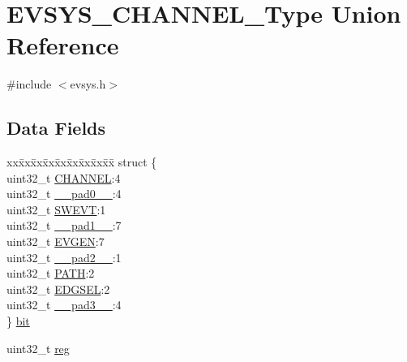 \hypertarget{union_e_v_s_y_s___c_h_a_n_n_e_l___type}{}\section{E\+V\+S\+Y\+S\+\_\+\+C\+H\+A\+N\+N\+E\+L\+\_\+\+Type Union Reference}
\label{union_e_v_s_y_s___c_h_a_n_n_e_l___type}


{\ttfamily \#include $<$evsys.\+h$>$}

\subsection*{Data Fields}
\begin{DoxyCompactItemize}
\item 
\begin{tabbing}
xx\=xx\=xx\=xx\=xx\=xx\=xx\=xx\=xx\=\kill
struct \{\\
\>uint32\_t \mbox{\hyperlink{union_e_v_s_y_s___c_h_a_n_n_e_l___type_a35f435efb5008b5086efe95dc8efd5d7}{CHANNEL}}:4\\
\>uint32\_t \mbox{\hyperlink{union_e_v_s_y_s___c_h_a_n_n_e_l___type_a3e57c2ef1c3ffb36722f000cc1156824}{\_\_pad0\_\_}}:4\\
\>uint32\_t \mbox{\hyperlink{union_e_v_s_y_s___c_h_a_n_n_e_l___type_aa30e84807f6b1e14d919c27d49c498f9}{SWEVT}}:1\\
\>uint32\_t \mbox{\hyperlink{union_e_v_s_y_s___c_h_a_n_n_e_l___type_a6712ba6dd1d5b43d2d56ff8ac4e275a7}{\_\_pad1\_\_}}:7\\
\>uint32\_t \mbox{\hyperlink{union_e_v_s_y_s___c_h_a_n_n_e_l___type_aa1c18190c67c763b81fb7f5bea7f3629}{EVGEN}}:7\\
\>uint32\_t \mbox{\hyperlink{union_e_v_s_y_s___c_h_a_n_n_e_l___type_a9ce12a63de64ef64ae2d59d128251cae}{\_\_pad2\_\_}}:1\\
\>uint32\_t \mbox{\hyperlink{union_e_v_s_y_s___c_h_a_n_n_e_l___type_a216ca974159317996e342b08706ae6a1}{PATH}}:2\\
\>uint32\_t \mbox{\hyperlink{union_e_v_s_y_s___c_h_a_n_n_e_l___type_a00ff9f4470ccefa56d71d4da9ec75eae}{EDGSEL}}:2\\
\>uint32\_t \mbox{\hyperlink{union_e_v_s_y_s___c_h_a_n_n_e_l___type_a4854608c0e776f0704a4d9a4b98ea57d}{\_\_pad3\_\_}}:4\\
\} \mbox{\hyperlink{union_e_v_s_y_s___c_h_a_n_n_e_l___type_aa49c0f94544d059495b4e2593b010f04}{bit}}\\

\end{tabbing}\item 
uint32\+\_\+t \mbox{\hyperlink{union_e_v_s_y_s___c_h_a_n_n_e_l___type_a6b91636401516a477989a336376d7b40}{reg}}
\end{DoxyCompactItemize}


